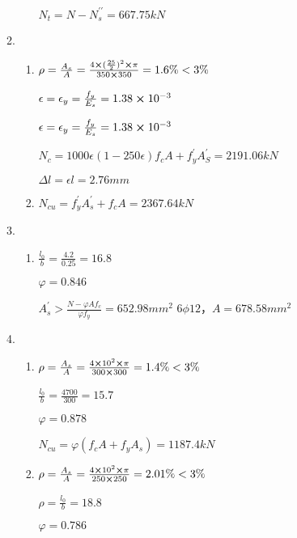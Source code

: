 \documentclass{article}
\begin{document}
\begin{enumerate}
\begin{enumerate}[1.]
\begin{enumerate}
                              \par$N_t=N-N_s^{\prime\prime}=667.75kN$
                    \end{enumerate}
              \item \begin{enumerate}
                        \item $\rho=\frac{A_s}{A}=\frac{4\cross(\frac{25}{2})^2\cross\pi}{350\cross350}=1.6\%<3\%$
                              \par$\epsilon=\epsilon_y=\frac{f_y}{E_s}=1.38\cross10^{-3}$
                              \par$\epsilon=\epsilon_y=\frac{f_y}{E_s}=1.38\cross10^{-3}$
                              \par$N_c=1000\epsilon(1-250\epsilon)f_cA+f_y^{\prime}A_S^{\prime}=2191.06kN$
                              \par$\Delta l=\epsilon l=2.76mm$
                        \item $N_{cu}=f_y^{\prime}A_s^{\prime}+f_cA=2367.64kN$
                    \end{enumerate}
              \item \begin{enumerate}
                        \item $\frac{l_0}{b}=\frac{4.2}{0.25}=16.8$
                              \par$\varphi=0.846$
                              \par$A_s^{\prime}>\frac{N-\varphi A f_c}{\varphi f_y}=652.98mm^2$
                              $6\phi12$，$A=678.58mm^2$
                    \end{enumerate}
              \item \begin{enumerate}
                        \item $\rho=\frac{A_s}{A}=\frac{4\cross10^2\cross\pi}{300\cross300}=1.4\%<3\%$
                              \par$\frac{l_0}{b}=\frac{4700}{300}=15.7$
                              \par$\varphi=0.878$
                              \par$N_{cu}=\varphi(f_cA+f_yA_s)=1187.4kN$
                        \item $\rho=\frac{A_s}{A}=\frac{4\cross10^2\cross\pi}{250\cross250}=2.01\%<3\%$
                              \par$\rho=\frac{l_0}{b}=18.8$
                              \par$\varphi=0.786$

\end{enumerate}
\end{enumerate}
\end{enumerate}
\end{document}
